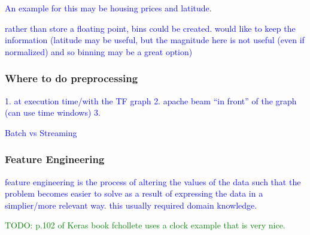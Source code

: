 \textcolor{blue}{An example for this may be housing prices and latitude.}


\textcolor{blue}{rather than store a floating point, bins could be created. would like to keep the information (latitude may be useful, but the magnitude here is not useful (even if normalized) and so binning may be a great option)}


\subsubsection{Where to do preprocessing}

\textcolor{blue}{1. at execution time/with the TF graph}
\textcolor{blue}{2. apache beam ``in front'' of the graph (can use time windows)}
\textcolor{blue}{3. }



\textcolor{blue}{Batch vs Streaming}


\subsubsection{Feature Engineering}

\textcolor{blue}{feature engineering is the process of altering the values of the data such that the problem becomes easier to solve as a result of expressing the data in a simplier/more relevant way. this usually required domain knowledge.}

\textcolor{green}{TODO: p.102 of Keras book fchollete uses a clock example that is very nice.}